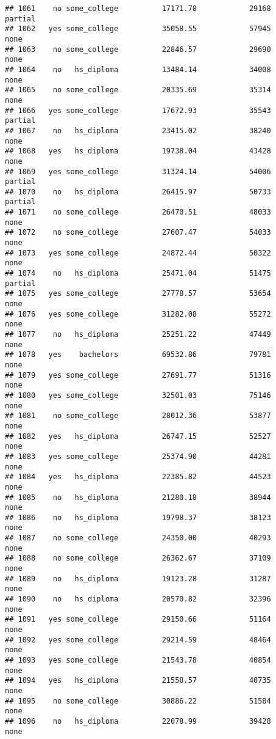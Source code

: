 \documentclass[
]{article}
\begin{document}
\begin{verbatim}
## 1061    no some_college          17171.78            29168     partial
## 1062   yes some_college          35058.55            57945        none
## 1063    no some_college          22846.57            29690        none
## 1064    no   hs_diploma          13484.14            34008        none
## 1065    no some_college          20335.69            35314        none
## 1066   yes some_college          17672.93            35543     partial
## 1067    no   hs_diploma          23415.02            38240        none
## 1068   yes   hs_diploma          19738.04            43428        none
## 1069   yes some_college          31324.14            54006     partial
## 1070    no   hs_diploma          26415.97            50733     partial
## 1071    no some_college          26470.51            48033        none
## 1072    no some_college          27607.47            54033        none
## 1073   yes some_college          24872.44            50322        none
## 1074    no   hs_diploma          25471.04            51475     partial
## 1075   yes some_college          27778.57            53654        none
## 1076   yes some_college          31282.08            55272        none
## 1077    no   hs_diploma          25251.22            47449        none
## 1078   yes    bachelors          69532.86            79781        none
## 1079   yes some_college          27691.77            51316        none
## 1080   yes some_college          32501.03            75146        none
## 1081    no some_college          28012.36            53877        none
## 1082   yes   hs_diploma          26747.15            52527        none
## 1083   yes some_college          25374.90            44281        none
## 1084   yes   hs_diploma          22385.82            44523        none
## 1085    no   hs_diploma          21280.18            38944        none
## 1086    no   hs_diploma          19798.37            38123        none
## 1087    no some_college          24350.00            40293        none
## 1088    no some_college          26362.67            37109        none
## 1089    no   hs_diploma          19123.28            31287        none
## 1090    no   hs_diploma          20570.82            32396        none
## 1091   yes some_college          29150.66            51164        none
## 1092   yes some_college          29214.59            48464        none
## 1093   yes some_college          21543.78            40854        none
## 1094   yes   hs_diploma          21558.57            40735        none
## 1095    no some_college          30886.22            51584        none
## 1096    no   hs_diploma          22078.99            39428        none

\end{verbatim}
\end{document}
